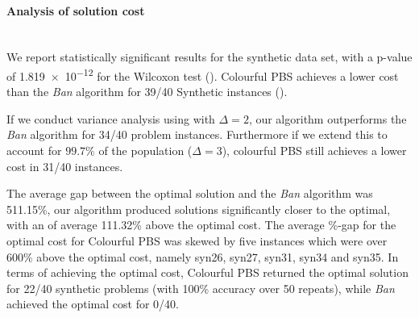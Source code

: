 

\paragraph{Analysis of solution cost}~\\
We report statistically significant results for the synthetic data set, with a p-value of \num{1.819e-12} for the Wilcoxon test (). Colourful PBS achieves a lower cost than the \emph{Ban} algorithm for 39/40 Synthetic instances (). 

If we conduct variance analysis using  with $\Delta =2$, our algorithm outperforms the \emph{Ban} algorithm for 34/40 problem instances. Furthermore if we extend this to account for $99.7\%$ of the population ($\Delta =3$),  colourful PBS still achieves a lower cost in 31/40 instances.

The average gap between the optimal solution and the \emph{Ban} algorithm was 511.15\%, our algorithm produced solutions significantly closer to the optimal, with an of average 111.32\% above the optimal cost. The average \%-gap for the optimal cost for Colourful PBS was skewed by five instances which were over 600\% above the optimal cost, namely syn26, syn27, syn31, syn34 and syn35. In terms of achieving the optimal cost, Colourful PBS returned the optimal solution for 22/40 synthetic problems (with 100\% accuracy over 50 repeats), while \emph{Ban} achieved the optimal cost for 0/40.